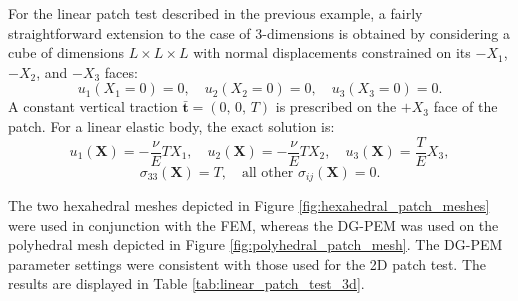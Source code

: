 For the linear patch test described in the previous example, a fairly straightforward extension to the case of 3-dimensions is obtained by considering a cube of dimensions $L \times L \times L$ with normal displacements constrained on its $-X_1$, $-X_2$, and $-X_3$ faces:
\begin{equation}
	u_1 (X_1 = 0) = 0, \quad u_2 (X_2 = 0) = 0, \quad u_3 (X_3 = 0) = 0.
\end{equation}
A constant vertical traction $\bar{\mathbf{t}} = (0, \, 0, \, T)$ is prescribed on the $+X_3$ face of the patch. For a linear elastic body, the exact solution is:
\begin{equation}
	u_1 (\mathbf{X}) = - \frac{\nu}{E} T X_1, \quad u_2 (\mathbf{X}) = - \frac{\nu}{E} T X_2, \quad u_3 (\mathbf{X}) = \frac{T}{E} X_3, 
\end{equation}
\begin{equation}
	\sigma_{33} (\mathbf{X}) = T, \quad \text{all other } \sigma_{ij} (\mathbf{X}) = 0.
\end{equation}


The two hexahedral meshes depicted in Figure \ref{fig:hexahedral_patch_meshes} were used in conjunction with the FEM, whereas the DG-PEM was used on the polyhedral mesh depicted in Figure \ref{fig:polyhedral_patch_mesh}. The DG-PEM parameter settings were consistent with those used for the 2D patch test. The results are displayed in Table \ref{tab:linear_patch_test_3d}.

